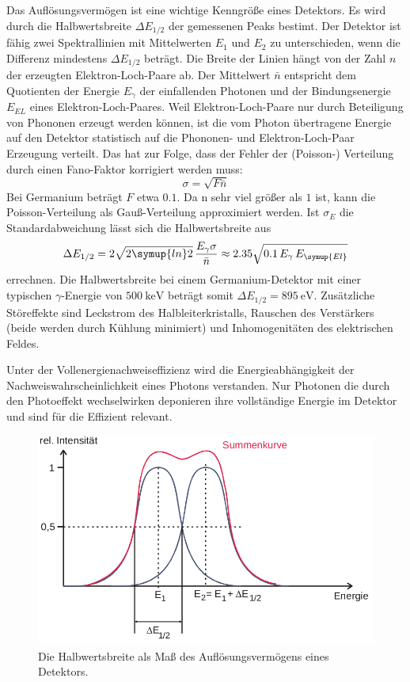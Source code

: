 Das Auflösungsvermögen ist eine wichtige Kenngröße eines Detektors.
Es wird durch die Halbwertsbreite $\Delta E_{1/2}$ der gemessenen Peaks bestimt.
Der Detektor ist fähig zwei Spektrallinien mit Mittelwerten $E_1$ und $E_2$ zu unterschieden, wenn die Differenz mindestens $\Delta E_{1/2}$ beträgt.
Die Breite der Linien hängt von der Zahl $n$ der erzeugten Elektron-Loch-Paare ab.
Der Mittelwert $\bar{n}$ entspricht dem Quotienten der Energie $E_{\gamma}$ der einfallenden Photonen und der Bindungsenergie $E_{EL}$ eines Elektron-Loch-Paares.
Weil Elektron-Loch-Paare nur durch Beteiligung von Phononen erzeugt werden können, ist die vom Photon übertragene Energie auf den Detektor statistisch auf die Phononen- und Elektron-Loch-Paar Erzeugung verteilt.
Das hat zur Folge, dass der Fehler der (Poisson-) Verteilung durch einen Fano-Faktor korrigiert werden muss:
\begin{equation*}
\sigma = \sqrt{F\bar{n}}
\end{equation*}
Bei Germanium beträgt $F$ etwa $0.1$.
Da n sehr viel größer als $1$ ist, kann die Poisson-Verteilung als Gauß-Verteilung approximiert werden.
Ist $\sigma_E$ die Standardabweichung lässt sich die Halbwertsbreite aus
\begin{equation}
\label{eq:aufloesung}
\Delta E_{1/2} = 2\sqrt{2\symup{ln}2}\,\frac{E_{\gamma}\sigma}{\bar{n}} \approx 2.35\sqrt{0.1\,E_\gamma\,E_{\symup{El}}}
\end{equation}
errechnen.
Die Halbwertsbreite bei einem Germanium-Detektor mit einer typischen $\gamma$-Energie von $\SI{500}{\kilo\electronvolt}$ beträgt somit $\Delta E_{1/2} =\SI{895}{\electronvolt}$.
Zusätzliche Störeffekte sind Leckstrom des Halbleiterkristalls, Rauschen des Verstärkers (beide werden durch Kühlung minimiert) und Inhomogenitäten des elektrischen Feldes.

Unter der Vollenergienachweiseffizienz wird die Energieabhängigkeit der Nachweiswahrscheinlichkeit eines Photons verstanden.
Nur Photonen die durch den Photoeffekt wechselwirken deponieren ihre vollständige Energie im Detektor und sind für die Effizient relevant.

 \begin{figure}
   \centering
   \includegraphics[height=7cm]{content/Breite.png}
   \caption{Die Halbwertsbreite als Maß des Auflösungsvermögens eines Detektors.\cite{V18}}
   \label{fig:Breite}
 \end{figure}

